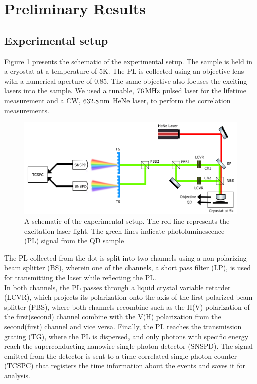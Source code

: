 \section{Preliminary Results}
\subsection{Experimental setup}
Figure \ref{fig:experiment_schematics} presents the schematic of the experimental setup. The sample is held in a cryostat  at a temperature of 5K. The PL is collected using an objective lens with a numerical aperture of 0.85. The same objective also focuses the exciting lasers into the sample. We used a tunable, $76\,\rm MHz$ pulsed laser for the lifetime measurement and a CW, $632.8\,\rm nm$ HeNe laser, to perform the correlation measurements. \\
	\begin{figure}[H]
		\centering
		\includegraphics[scale=0.50]{figures/Experiment_schematics.png}
		\caption{A schematic of the experimental setup. The red line represents the excitation laser light. The green lines indicate photoluminescence (PL) signal from the QD sample}
		\label{fig:experiment_schematics}
	\end{figure}
The PL collected from the dot is split into two channels using a non-polarizing beam splitter (BS), wherein one of the channels, a short pass filter (LP), is used for transmitting the laser while reflecting the PL.\\
In both channels, the PL passes through a liquid crystal variable retarder (LCVR), which projects its polarization onto the axis of the first polarized beam splitter (PBS), where both channels recombine such as the H(V) polarization of the first(second) channel combine with the V(H) polarization from the second(first) channel and vice versa. Finally, the PL reaches the transmission grating (TG), where the PL is dispersed, and only photons with specific energy reach the superconducting nanowire single photon detector (SNSPD). The signal emitted from the detector is sent to a time-correlated single photon counter (TCSPC) that registers the time information about the events and saves it for analysis. 
